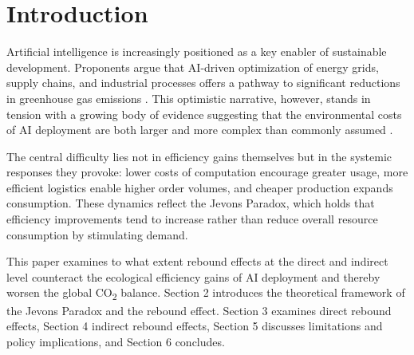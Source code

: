 \section{Introduction}
\label{sec:introduction}

Artificial intelligence is increasingly positioned as a key
enabler of sustainable development. Proponents argue that
AI-driven optimization of energy grids, supply chains, and
industrial processes offers a pathway to significant reductions
in greenhouse gas emissions \cite{mhlanga2025}. This optimistic
narrative, however, stands in tension with a growing body of
evidence suggesting that the environmental costs of AI
deployment are both larger and more complex than commonly
assumed \cite{luccioni2025}.

The central difficulty lies not in efficiency gains themselves
but in the systemic responses they provoke: lower costs of
computation encourage greater usage, more efficient logistics
enable higher order volumes, and cheaper production expands
consumption. These dynamics reflect the Jevons Paradox, which
holds that efficiency improvements tend to increase rather than
reduce overall resource consumption by stimulating demand.

This paper examines to what extent rebound effects at the
direct and indirect level counteract the ecological efficiency
gains of AI deployment and thereby worsen the global CO\textsubscript{2} balance.
Section 2 introduces the theoretical framework of the Jevons
Paradox and the rebound effect. Section 3 examines direct
rebound effects, Section 4 indirect rebound effects, Section 5
discusses limitations and policy implications, and Section 6
concludes.
